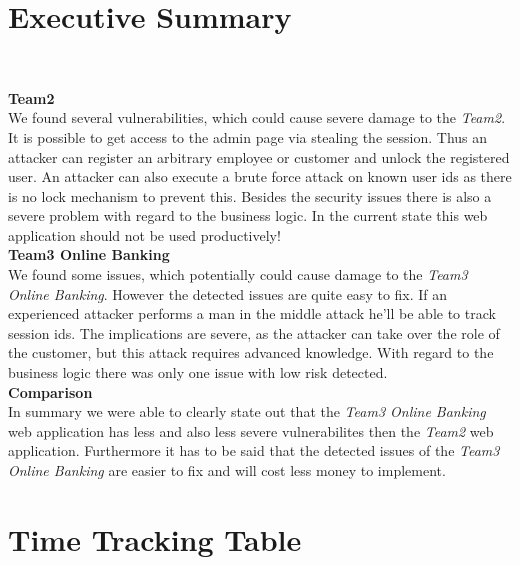 \documentclass[headsepline,footsepline,footinclude=false,oneside,fontsize=11pt,paper=a4,listof=totoc,bibliography=totoc]{scrbook} %
\begin{document}


\frontmatter{}


{
	\chapter{Executive Summary}\

   \textbf{Team2}\\

	We found several vulnerabilities, which could cause severe damage to the \textit{Team2}. It is possible to get access to the admin page via stealing the session. Thus an attacker can register an arbitrary employee or customer and unlock the registered user. An	attacker can also execute a brute force attack on known user ids as there is no lock mechanism to prevent this. Besides the security issues there is also a severe problem with regard to the business logic. In the current state this web application should not be used productively!	\\


	\textbf{Team3 Online Banking}\\

	We found some issues, which potentially could cause damage to the \textit{Team3 Online Banking}. However the detected issues are quite easy to fix. If an experienced attacker performs a man in the middle attack he'll be able to track session ids. The implications are severe, as the	attacker can take over the role of the customer, but this attack requires advanced knowledge. With regard to the business logic there was only one issue with low risk detected. \\

	\textbf{Comparison}\\

	In summary we were able to clearly state out that the \textit{Team3 Online Banking} web application has less and also less severe vulnerabilites then the \textit{Team2} web application. Furthermore it has to be said that the detected issues of the \textit{Team3 Online Banking} are easier to fix and will cost less money to implement.
}

\pagebreak
%
%
%
%
\tableofcontents{}
\mainmatter{}

\chapter{Time Tracking Table}
\end{document}
